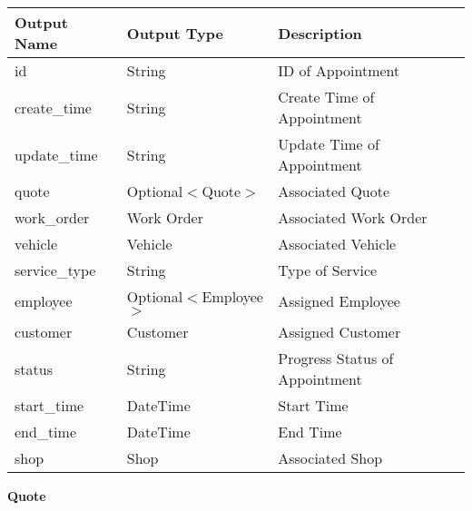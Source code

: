 \documentclass[12pt, titlepage]{article}
\begin{document}
\begin{table}[H]
	\begin{tabular}{|p{}|p{}|p{}|}
		\hline
		\textbf{Output Name} & \textbf{Output Type}   & \textbf{Description}           \\
		\hline
		id                   & String                 & ID of Appointment              \\
		\hline
		create\_time         & String                 & Create Time of Appointment     \\
		\hline
		update\_time         & String                 & Update Time of Appointment     \\
		\hline
		quote                & Optional$<$Quote$>$    & Associated Quote               \\
		\hline
		work\_order          & Work Order             & Associated Work Order          \\
		\hline
		vehicle              & Vehicle                & Associated Vehicle             \\
		\hline
		service\_type        & String                 & Type of Service                \\
		\hline
		employee             & Optional$<$Employee$>$ & Assigned Employee              \\
		\hline
		customer             & Customer               & Assigned Customer              \\
		\hline
		status               & String                 & Progress Status of Appointment \\
		\hline
		start\_time          & DateTime               & Start Time                     \\
		\hline
		end\_time            & DateTime               & End Time                       \\
		\hline
		shop                 & Shop                   & Associated Shop                \\
		\hline
	\end{tabular}
\end{table}

\textbf{Quote}
\end{document}
